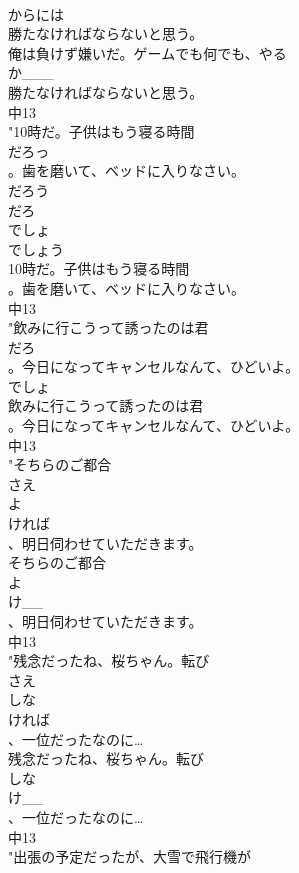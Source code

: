 \documentclass[8pt]{extreport}
\begin{document}
\begin{CJK}{UTF8}{min}
\\	からには
\\	勝たなければならないと思う。
\\	俺は負けず嫌いだ。ゲームでも何でも、やる
\\	か___
\\	勝たなければならないと思う。
\\	中13
\\	"10時だ。子供はもう寝る時間
\\	だろっ
\\	。歯を磨いて、ベッドに入りなさい。 
\\	だろう
\\	だろ
\\	でしょ
\\	でしょう
\\	10時だ。子供はもう寝る時間
\\	。歯を磨いて、ベッドに入りなさい。
\\	中13
\\	"飲みに行こうって誘ったのは君
\\	だろ
\\	。今日になってキャンセルなんて、ひどいよ。
\\	でしょ
\\	飲みに行こうって誘ったのは君
\\	。今日になってキャンセルなんて、ひどいよ。
\\	中13
\\	"そちらのご都合
\\	さえ
\\	よ
\\	ければ
\\	、明日伺わせていただきます。
\\	そちらのご都合
\\	よ
\\	け__
\\	、明日伺わせていただきます。
\\	中13
\\	"残念だったね、桜ちゃん。転び
\\	さえ
\\	しな
\\	ければ
\\	、一位だったなのに…
\\	残念だったね、桜ちゃん。転び
\\	しな
\\	け__
\\	、一位だったなのに…
\\	中13
\\	"出張の予定だったが、大雪で飛行機が

\end{CJK}
\end{document}
